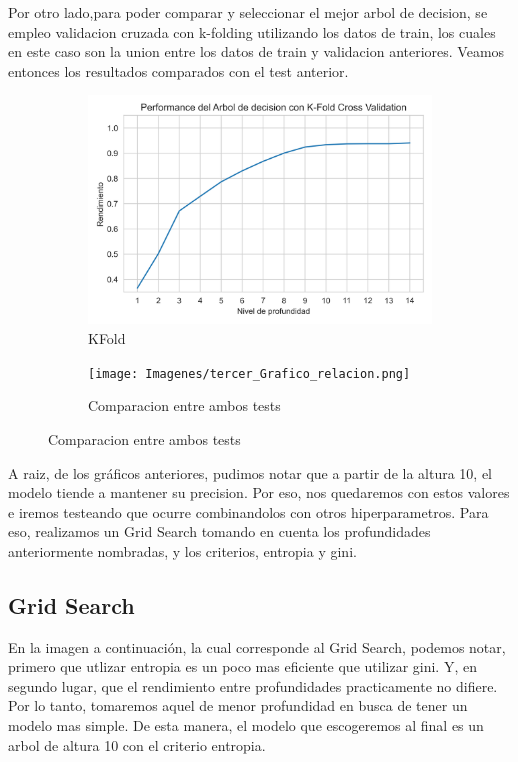 \documentclass[10pt,a4paper]{article}
\begin{document}
Por otro lado,para poder comparar y seleccionar el mejor arbol de decision, se empleo validacion cruzada con k-folding utilizando los datos de train, los cuales
en este caso son la union entre los datos de train y validacion anteriores. Veamos entonces los resultados comparados con el test anterior.

\begin{figure}[ht!]
	\begin{subfigure}{0.5\textwidth}
		\includegraphics[width=1\linewidth]{Imagenes/KFold_prueba_arbol.png} 
		\caption{KFold}
		\label{fig:subfig1}
	\end{subfigure}
	\begin{subfigure}{0.5\textwidth}
		\texttt{[image: Imagenes/tercer\_Grafico\_relacion.png]}
		\caption{Comparacion entre ambos tests}
		\label{fig:subfig2}
	\end{subfigure}
	\label{fig:subfigs}
\end{figure}

A raiz, de los gráficos anteriores, pudimos notar que a partir de la altura 10, el modelo tiende a mantener su precision. Por eso, nos quedaremos con estos valores e iremos testeando que ocurre combinandolos con otros hiperparametros. Para eso, realizamos un Grid Search tomando en cuenta los profundidades anteriormente nombradas, y los criterios, entropia y gini.

\newpage

\subsection{Grid Search}

En la imagen a continuación, la cual corresponde al Grid Search, podemos notar, primero que utlizar entropia es un poco mas eficiente que utilizar gini. Y, en segundo lugar, que el rendimiento entre profundidades practicamente no difiere. Por lo tanto, tomaremos aquel de menor profundidad en busca de tener un modelo mas simple. De esta manera, el modelo que escogeremos al final es un arbol de altura 10 con el criterio entropia. \vspace{0.05cm}
\end{document}

